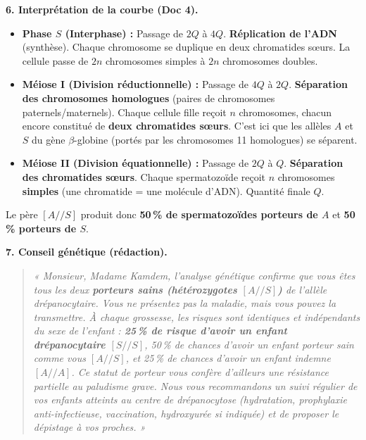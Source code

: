 \documentclass[11pt]{article}
\begin{document}
\begin{exoresolu}
\textbf{6. Interprétation de la courbe (Doc 4).}
\begin{itemize}
\item \textbf{Phase $S$ (Interphase) :} Passage de $2Q$ à $4Q$. \textbf{Réplication de l'ADN} (synthèse). Chaque chromosome se duplique en deux chromatides sœurs. La cellule passe de $2n$ chromosomes simples à $2n$ chromosomes doubles.
\item \textbf{Méiose I (Division réductionnelle) :} Passage de $4Q$ à $2Q$. \textbf{Séparation des chromosomes homologues} (paires de chromosomes paternels/maternels). Chaque cellule fille reçoit $n$ chromosomes, chacun encore constitué de \textbf{deux chromatides sœurs}. C'est ici que les allèles $A$ et $S$ du gène $\beta$-globine (portés par les chromosomes 11 homologues) se séparent.
\item \textbf{Méiose II (Division équationnelle) :} Passage de $2Q$ à $Q$. \textbf{Séparation des chromatides sœurs}. Chaque spermatozoïde reçoit $n$ chromosomes \textbf{simples} (une chromatide = une molécule d'ADN). Quantité finale $Q$.
\end{itemize}
Le père $[A//S]$ produit donc \textbf{50\,\% de spermatozoïdes porteurs de $A$} et \textbf{50\,\% porteurs de $S$}.

\textbf{7. Conseil génétique (rédaction).}
\begin{quote}
\textit{« Monsieur, Madame Kamdem, l'analyse génétique confirme que vous êtes tous les deux \textbf{porteurs sains (hétérozygotes $[A//S]$)} de l'allèle drépanocytaire. Vous ne présentez pas la maladie, mais vous pouvez la transmettre. À chaque grossesse, les risques sont identiques et indépendants du sexe de l'enfant : \textbf{25\,\% de risque d'avoir un enfant drépanocytaire $[S//S]$}, 50\,\% de chances d'avoir un enfant porteur sain comme vous $[A//S]$, et 25\,\% de chances d'avoir un enfant indemne $[A//A]$. Ce statut de porteur vous confère d'ailleurs une résistance partielle au paludisme grave. Nous vous recommandons un suivi régulier de vos enfants atteints au centre de drépanocytose (hydratation, prophylaxie anti-infectieuse, vaccination, hydroxyurée si indiquée) et de proposer le dépistage à vos proches. »}
\end{quote}
\end{exoresolu}
\end{document}
